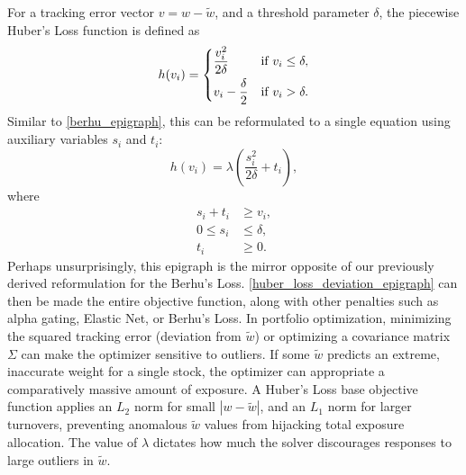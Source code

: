\documentclass[11pt, letterpaper]{article}
\begin{document}
For a tracking error vector $v = w - \tilde{w}$, and a threshold parameter $\delta$, the piecewise Huber's Loss
function is defined as
\begin{equation*}
    h(v_i) = \begin{dcases}
        \frac{v_i^2}{2\delta} & \text{if } v_i \leq \delta, \\
        v_i - \frac{\delta}{2} & \text{if } v_i > \delta.
    \end{dcases}
\end{equation*}
Similar to \eqref{berhu_epigraph}, this can be reformulated to a single equation using auxiliary
variables $s_i$ and $t_i$:
\begin{equation}
	\label{huber_loss_deviation_epigraph}
	h(v_i) = \lambda\left(\frac{s_i^2}{2\delta} + t_i\right),
\end{equation}
where
\begin{align*}
	s_i + t_i &\geq v_i,\\
	0 \leq s_i &\leq \delta, \\
	t_i &\geq 0.
\end{align*}
Perhaps unsurprisingly, this epigraph is the mirror opposite of our previously derived reformulation for the Berhu's Loss.
\eqref{huber_loss_deviation_epigraph} can then be made the entire objective function, along with other penalties such as alpha
gating, Elastic Net, or Berhu's Loss. In portfolio optimization, minimizing the squared tracking error (deviation from
$\tilde{w}$) or optimizing a covariance matrix $\Sigma$ can make the optimizer sensitive to outliers. If some $\tilde{w}$
predicts an extreme, inaccurate weight for a single stock, the optimizer can appropriate a comparatively massive amount of
exposure. A Huber's Loss base objective function applies an $L_2$ norm for small $|w - \tilde{w}|$, and an $L_1$ norm for larger
turnovers, preventing anomalous $\tilde{w}$ values from hijacking total exposure allocation. The value of $\lambda$ dictates how
much the solver discourages responses to large outliers in $\tilde{w}$.

\end{document}
